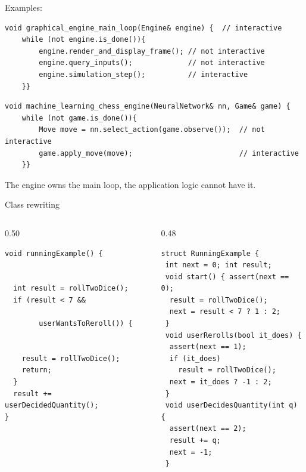 \documentclass[aspectratio=169,11pt]{beamer}
\begin{document}
\begin{frame}[fragile]{Examples:}

\begin{lstlisting}[style=cppstyle]
void graphical_engine_main_loop(Engine& engine) {  // interactive
    while (not engine.is_done()){
        engine.render_and_display_frame(); // not interactive
        engine.query_inputs();             // not interactive
        engine.simulation_step();          // interactive
    }}
\end{lstlisting}

\begin{lstlisting}[style=cppstyle]
void machine_learning_chess_engine(NeuralNetwork& nn, Game& game) {  
    while (not game.is_done()){
        Move move = nn.select_action(game.observe());  // not interactive
        game.apply_move(move);                         // interactive 
    }}
\end{lstlisting}
The engine owns the main loop, the application logic cannot have it.
\end{frame}

\begin{frame}{Class rewriting}
  \begin{columns}[T,onlytextwidth]
\begin{column}{0.50\textwidth}
\begin{lstlisting}[style=cppstyle,numbers=none]
void runningExample() {


  int result = rollTwoDice();
  if (result < 7 && 

        userWantsToReroll()) { 


    result = rollTwoDice();
    return;
  }
  result += userDecidedQuantity(); 
}
\end{lstlisting}
\end{column}
    \begin{column}{0.48\textwidth}
\begin{lstlisting}[style=cppstyle,numbers=none]
struct RunningExample {
 int next = 0; int result;
 void start() { assert(next == 0);
  result = rollTwoDice();
  next = result < 7 ? 1 : 2;
 }
 void userRerolls(bool it_does) { 
  assert(next == 1);
  if (it_does)
    result = rollTwoDice();
  next = it_does ? -1 : 2;
 }
 void userDecidesQuantity(int q) { 
  assert(next == 2);
  result += q;
  next = -1;
 }
\end{lstlisting}
\end{column}
\end{columns}

\end{frame}
\end{document}
